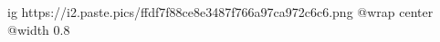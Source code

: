  
 
 
 
 

\ifcmt
  ig https://i2.paste.pics/ffdf7f88ce8e3487f766a97ca972c6c6.png
  @wrap center
  @width 0.8
\fi
